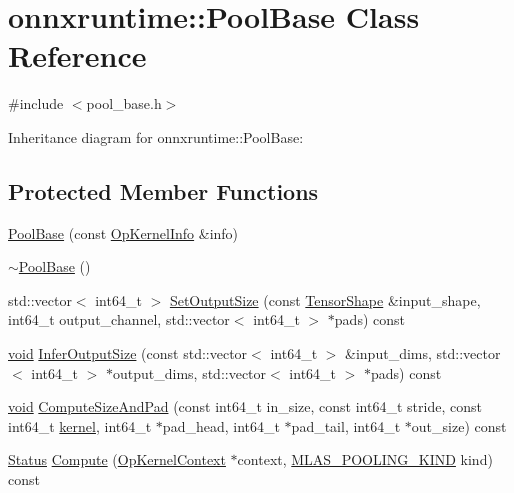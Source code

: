 \hypertarget{classonnxruntime_1_1PoolBase}{}\section{onnxruntime\+:\+:Pool\+Base Class Reference}
\label{classonnxruntime_1_1PoolBase}


{\ttfamily \#include $<$pool\+\_\+base.\+h$>$}



Inheritance diagram for onnxruntime\+:\+:Pool\+Base\+:
\subsection*{Protected Member Functions}
\begin{DoxyCompactItemize}
\item 
\mbox{\hyperlink{classonnxruntime_1_1PoolBase_a5af935e3b9738fdb207395c9dae84c21}{Pool\+Base}} (const \mbox{\hyperlink{classonnxruntime_1_1OpKernelInfo}{Op\+Kernel\+Info}} \&info)
\item 
\mbox{\hyperlink{classonnxruntime_1_1PoolBase_a170ff68bb0fefc4f2bf365a35a7691d3}{$\sim$\+Pool\+Base}} ()
\item 
std\+::vector$<$ int64\+\_\+t $>$ \mbox{\hyperlink{classonnxruntime_1_1PoolBase_aa29f1684c5e53beece327006e1e8f9e7}{Set\+Output\+Size}} (const \mbox{\hyperlink{classonnxruntime_1_1TensorShape}{Tensor\+Shape}} \&input\+\_\+shape, int64\+\_\+t output\+\_\+channel, std\+::vector$<$ int64\+\_\+t $>$ $\ast$pads) const
\item 
\mbox{\hyperlink{mlasi_8h_a88f941d423cb2a819b70a1358982b1a6}{void}} \mbox{\hyperlink{classonnxruntime_1_1PoolBase_ab49048558a89a492f93cc36f5e7ab599}{Infer\+Output\+Size}} (const std\+::vector$<$ int64\+\_\+t $>$ \&input\+\_\+dims, std\+::vector$<$ int64\+\_\+t $>$ $\ast$output\+\_\+dims, std\+::vector$<$ int64\+\_\+t $>$ $\ast$pads) const
\item 
\mbox{\hyperlink{mlasi_8h_a88f941d423cb2a819b70a1358982b1a6}{void}} \mbox{\hyperlink{classonnxruntime_1_1PoolBase_ab9c9f378646859e71ecd332088797b6a}{Compute\+Size\+And\+Pad}} (const int64\+\_\+t in\+\_\+size, const int64\+\_\+t stride, const int64\+\_\+t \mbox{\hyperlink{mkldnn_2nn_2pool_8cc_a1fd14bdce0b9db48a6bf8c6ce1320490}{kernel}}, int64\+\_\+t $\ast$pad\+\_\+head, int64\+\_\+t $\ast$pad\+\_\+tail, int64\+\_\+t $\ast$out\+\_\+size) const
\item 
\mbox{\hyperlink{classonnxruntime_1_1common_1_1Status}{Status}} \mbox{\hyperlink{classonnxruntime_1_1PoolBase_a231b67fa3cae697f680c87d55deab443}{Compute}} (\mbox{\hyperlink{classonnxruntime_1_1OpKernelContext}{Op\+Kernel\+Context}} $\ast$context, \mbox{\hyperlink{mlas_8h_a308be0f1e44b0324610000287f348222}{M\+L\+A\+S\+\_\+\+P\+O\+O\+L\+I\+N\+G\+\_\+\+K\+I\+ND}} kind) const

\end{DoxyCompactItemize}
